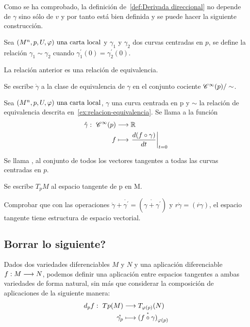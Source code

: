 Como se ha comprobado, la definición de~\ref{def:Derivada direccional} no depende de $\gamma$
sino sólo de $v$ y por tanto está bien definida y se puede hacer la siguiente construcción.

Sea $(M^n,p,U,\varphi)\textmd{ una carta local}$ y $\gamma_1$ y $\gamma_2$ dos curvas centradas en $p$, se define la relación
$\gamma_1\sim\gamma_2$ cuando $\gamma_1^{'}(0)=\gamma_2^{'}(0)$.

\begin{exercise}
  \label{ex:relacion-equivalencia}
  La relación anterior es una relación de equivalencia.
\end{exercise}
\begin{notation}
Se escribe $\mathring{\gamma}$ a la clase de equivalencia de $\gamma$ en el conjunto cociente
$\mathscr{C}^\infty(p)/\sim$.
\end{notation}

\begin{definition}
  Sea $(M^n,p,U,\varphi)\textmd{ una carta local}$, $\gamma$ una curva centrada en p y $\sim$ la relación de equivalencia
  descrita en~\ref{ex:relacion-equivalencia}.
  Se llama  a la
  función
  \begin{equation}
    \label{eq:vector-tangente-curva}
    \begin{alignedat}{1}
      \mathring{\gamma}:\ \mathscr{C}^\infty(p) & \longrightarrow \mathbb{R} \\ f & \longmapsto \left.\frac{d(f\circ\gamma)}{dt}\right|_{t=0}
    \end{alignedat}
  \end{equation}
\end{definition}
\begin{definition}
  Se llama , al
  conjunto de todos los vectores tangentes a todas las curvas centradas en $p$.
\end{definition}
\begin{notation}
  Se escribe $T_pM$ al espacio tangente de p en M.
\end{notation}

\begin{exercise}
  Comprobar que con las operaciones $\mathring{\gamma}+\mathring{\gamma^\prime}=
  (\mathring{\gamma+\gamma^\prime})$ y $r\mathring{\gamma}=(\mathring{r\gamma})$, el espacio
  tangente tiene estructura de espacio vectorial.
\end{exercise}

\subsection{Borrar lo siguiente?}
Dados dos variedades diferenciables $M$ y $N$ y una aplicación diferenciable $f:M\longrightarrow N$,
podemos definir una aplicación entre espacios tangentes a ambas variedades de forma natural, sin
más que considerar la composición de aplicaciones de la siguiente manera:
\begin{equation}
  \label{eq:diferencial-aplicacion}
  \begin{alignedat}{1}
    d_pf:\ Tp(M) & \longrightarrow T_{\varphi(p)}(N) \\ \mathring{\gamma_p} & \longmapsto \mathring{(f\circ\gamma)
    }_{\varphi
    (p)}
  \end{alignedat}
\end{equation}

